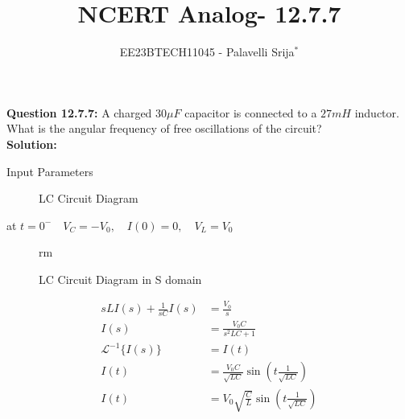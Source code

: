 \documentclass[journal,12pt,twocolumn]{IEEEtran}
\theoremstyle{remark}
\begin{document}

\vspace{3cm}

\title{NCERT Analog- 12.7.7}
\author{EE23BTECH11045 - Palavelli Srija$^{*}$}

\maketitle

\bigskip

\renewcommand{\thefigure}{\theenumi}
\renewcommand{\thetable}{\theenumi}

\vspace{3cm}
\textbf{Question 12.7.7:} 
 A charged $30 \mu F$ capacitor is connected to a $27 mH$ inductor. What is the angular frequency of free oscillations of the circuit?\\
\textbf{Solution: }
\begin{table}[h!]
    \centering
    
    \caption{Input Parameters}
    \label{tab:table_omega}
\end{table}
\begin{figure}[H]
    \centering
    
    \caption{LC Circuit Diagram}
    \label{fig:omega2}
\end{figure}
at $t=0^-\quad V_C=-V_0,\quad I(0)=0,\quad V_L=V_0$\\

\begin{figure}[H]
    \centering
    
rm    \caption{LC Circuit Diagram in S domain}
    \label{fig:2}
\end{figure}
\begin{align}
sL I(s) + \frac{1}{sC} I(s) &= \frac{V_0}{s} \\
I(s) &= \frac{V_0C}{s^2LC + 1} \\
\mathcal{L}^{-1}\{I(s)\} &= I(t) \\
I(t) &= \frac{V_0C}{\sqrt{LC}} \sin\left(t\frac{1}{\sqrt{LC}}\right) \\
I(t) &= V_0\sqrt{\frac{C}{L}} \sin\left(t\frac{1}{\sqrt{LC}}\right)
\end{align}
\end{document}
